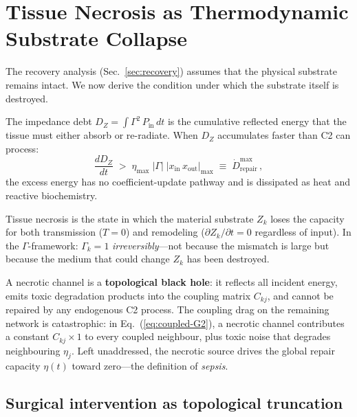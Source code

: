 \documentclass[aps,pre,twocolumn,superscriptaddress,floatfix]{revtex4-2}
\begin{document}
\section{Tissue Necrosis as Thermodynamic
  Substrate Collapse}
\label{sec:necrosis}

The recovery analysis
(Sec.~\ref{sec:recovery}) assumes that the
physical substrate remains intact.
We now derive the condition under which the
substrate itself is destroyed.

The impedance debt
$D_Z = \int \Gamma^2\,P_{\text{in}}\,dt$
is the cumulative reflected energy that the tissue
must either absorb or re-radiate.
When $D_Z$ accumulates faster than C2 can process:
\begin{equation}
  \frac{dD_Z}{dt}
  \;>\;
  \eta_{\max}\;|\Gamma|\;|x_{\text{in}}\,
  x_{\text{out}}|_{\max}
  \;\equiv\;
  \dot{D}_{\text{repair}}^{\max}\,,
  \label{eq:necrosis-condition}
\end{equation}
the excess energy has no coefficient-update
pathway and is dissipated as heat and
reactive biochemistry.

\begin{definition}
\label{def:necrosis}
Tissue necrosis is the state in which
the material substrate $Z_k$ loses the
capacity for both transmission ($T = 0$)
and remodeling
($\partial Z_k/\partial t = 0$
regardless of input).
In the $\Gamma$-framework:
$\Gamma_k = 1$ \emph{irreversibly}---not because
the mismatch is large but because the medium that
could change $Z_k$ has been destroyed.
\end{definition}

\noindent
A necrotic channel is a \textbf{topological black
hole}: it reflects all incident energy, emits toxic
degradation products into the coupling matrix
$C_{kj}$, and cannot be repaired by any endogenous
C2 process.
The coupling drag on the remaining network is
catastrophic: in Eq.~(\ref{eq:coupled-G2}),
a necrotic channel contributes a constant
$C_{kj} \times 1$ to every coupled neighbour, plus
toxic noise that degrades neighbouring $\eta_j$.
Left unaddressed, the necrotic source
drives the global repair capacity $\eta(t)$ toward
zero---the definition of \emph{sepsis}.


\subsection{Surgical intervention as topological
  truncation}
\label{sec:truncation}
\end{document}
